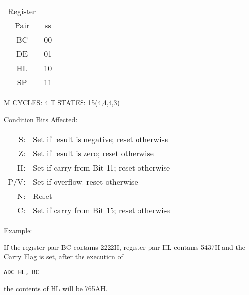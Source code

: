 \begin{tabular}{c c}
\underline{Register} &\\
\underline{Pair} & \underline{ss}\\
BC & 00 \\
DE & 01 \\
HL & 10 \\
SP & 11 \\
\end{tabular}

M CYCLES: 4 T STATES: 15(4,4,4,3) 

\underline{Condition Bits Affected:} 

\begin{tabular}{r l}
S: & Set if result is negative; reset otherwise \\
Z: & Set if result is zero; reset otherwise \\
H: & Set if carry from Bit 11; reset otherwise \\ 
P/V: & Set if overflow; reset otherwise \\
N: & Reset \\
C: & Set if carry from Bit 15; reset otherwise \\
\end{tabular}

\underline{Example:} 

If the register pair BC contains 2222H, register pair HL contains 5437H and the Carry Flag is set, after the execution of

\begin{verbatim}
ADC HL, BC 
\end{verbatim}

the contents of HL will be 765AH. 

